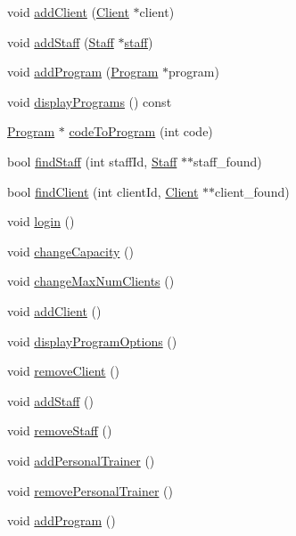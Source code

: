 \begin{DoxyCompactItemize}
\item 
void \hyperlink{classGym_acac736895e644c2d1d6bd18a90759e25}{add\+Client} (\hyperlink{classClient}{Client} $\ast$client)
\item 
void \hyperlink{classGym_a846e253b4e54365c8aa86a97def9a77f}{add\+Staff} (\hyperlink{classStaff}{Staff} $\ast$\hyperlink{classGym_a9108e2c97ee58a50e491461559aa12fe}{staff})
\item 
void \hyperlink{classGym_a1c83ad093ebea272ecc929a069952ffa}{add\+Program} (\hyperlink{classProgram}{Program} $\ast$program)
\item 
void \hyperlink{classGym_a7f526090a67c00b5bc4d79fd13a7ed61}{display\+Programs} () const 
\item 
\hyperlink{classProgram}{Program} $\ast$ \hyperlink{classGym_a27ed4e97c958ba5d38c14c1313f3a0b1}{code\+To\+Program} (int code)
\item 
bool \hyperlink{classGym_addda8ae9a7519b2efe2011ab351024b4}{find\+Staff} (int staff\+Id, \hyperlink{classStaff}{Staff} $\ast$$\ast$staff\+\_\+found)
\item 
bool \hyperlink{classGym_ae1645f954f54d7689fff985dbfc5bbae}{find\+Client} (int client\+Id, \hyperlink{classClient}{Client} $\ast$$\ast$client\+\_\+found)
\item 
void \hyperlink{classGym_a2e1031f5bb4e7d064a7d24fccaae0abe}{login} ()
\item 
void \hyperlink{classGym_affb825a0c5ab2d3b2039f6ba82080064}{change\+Capacity} ()
\item 
void \hyperlink{classGym_a1a8d882d2e0cb3df944546172505a6ea}{change\+Max\+Num\+Clients} ()
\item 
void \hyperlink{classGym_a5335d3e59e2365cef2044ad354cfc70a}{add\+Client} ()
\item 
void \hyperlink{classGym_a18c13a04b2c4d019a51df3594bda8cbb}{display\+Program\+Options} ()
\item 
void \hyperlink{classGym_a5b393a1de3a2785172c7539b7476c553}{remove\+Client} ()
\item 
void \hyperlink{classGym_a64978dffee81efbcf1fca38fe111f2b1}{add\+Staff} ()
\item 
void \hyperlink{classGym_a181fdf971e25b48dce26d24fa7f8d50d}{remove\+Staff} ()
\item 
void \hyperlink{classGym_a40d3f9a53f71c9f4e9fd3e05b48a25b1}{add\+Personal\+Trainer} ()
\item 
void \hyperlink{classGym_a723219b3a3f855f9ff90c00d4e8dfb81}{remove\+Personal\+Trainer} ()
\item 
void \hyperlink{classGym_a5e873ed60bba5fab835947eb7266b676}{add\+Program} ()

\end{DoxyCompactItemize}
